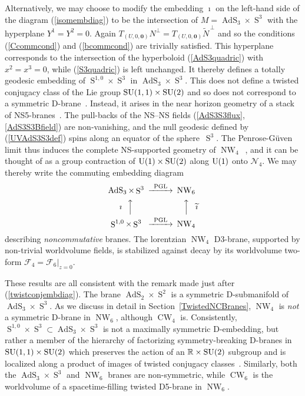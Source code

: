 \documentclass[11pt,a4paper]{article}
\DeclareMathOperator{\AdS}{AdS}
\DeclareMathOperator{\Sphere}{S}
\DeclareMathOperator{\NW}{NW}
\DeclareMathOperator{\CW}{CW}
\let\S\Sphere
\newcommand{\mbf}[1]{{\boldsymbol {#1} }}
\newcommand{\real}{{\mathbb R}} %
\begin{document}
Alternatively, we may choose to modify the embedding $\imath$ on the
left-hand side of the diagram (\ref{isomembdiag}) to be the
intersection of $M=\AdS_3\times\S^3$ with the hyperplane
$Y^1=Y^2=0$. Again
$T_{(U,0,\mbf0)}N^\perp=T_{(U,0,\mbf0)}\widetilde{N}^{\,\perp}$ and so the
conditions (\ref{Ccommcond}) and (\ref{bcommcond}) are trivially
satisfied. This hyperplane corresponds to the intersection of the
hyperboloid (\ref{AdS3quadric}) with $x^2=x^3=0$, while
(\ref{S3quadric}) is left unchanged. It thereby defines a totally
geodesic embedding of $\S^{1,0}\times\S^3$ in
$\AdS_3\times\S^3$. This does not define a twisted conjugacy class of
the Lie group ${\rm SU}(1,1)\times{\rm SU}(2)$ and so does not
correspond to a symmetric D-brane~\cite{BP1}. Instead, it arises in the near
horizon geometry of a stack of NS5-branes~\cite{GO1}. The pull-backs
of the NS--NS fields (\ref{AdS3S3flux},\ref{AdS3S3Bfield}) are
non-vanishing, and the null geodesic defined by (\ref{UVAdS3S3def})
spins along an equator of the sphere~$\S^3$. The Penrose-G\"uven limit
thus induces the complete NS-supported geometry of
$\NW_4$~\cite{DAK1}, and it can be thought of as a group contraction
of ${\rm U}(1)\times{\rm SU}(2)$ along ${\rm U}(1)$ onto
$\mathcal{N}_4$. We may thereby write the commuting embedding diagram
\begin{equation}
  \label{NW4commdiag}
  \begin{CD}
    \AdS_3 \times \S^3             @>\text{PGL}>> \NW_6\\
    \text{$\imath~~$}@AAA @AAA\text{$\widetilde{\imath}$}\\
    \S^{1,0}\times\S^3         @>\text{PGL}>> \NW_4\\
  \end{CD}
\end{equation}
describing {\it noncommutative} branes. The lorentzian $\NW_4$
D3-brane, supported by non-trivial worldvolume fields, is stabilized
against decay by its worldvolume two-form
$\mathcal{F}_4=\mathcal{F}_6|_{z=0}$.

These results are all consistent with the remark made just after
(\ref{twistconjembdiag}). The brane $\AdS_2\times\S^2$ is a symmetric
D-submanifold of $\AdS_3\times\S^3$. As we discuss in detail in
Section~\ref{TwistedNCBranes}, $\NW_4$ is {\it not} a symmetric
D-brane in $\NW_6$, although $\CW_4$ is. Consistently,
$\S^{1,0}\times\S^3\subset\AdS_3\times\S^3$ is not a maximally
symmetric D-embedding, but rather a member of the hierarchy of
factorizing symmetry-breaking D-branes in ${\rm SU}(1,1)\times{\rm
  SU}(2)$ which preserves the action of an $\real\times{\rm SU}(2)$
subgroup and is localized along a product of images of twisted conjugacy
classes~\cite{Quella1}. Similarly, both the $\AdS_3\times\S^3$ and
$\NW_6$ branes are non-symmetric, while $\CW_6$ is the worldvolume
of a spacetime-filling twisted D5-brane in $\NW_6$.
\end{document}
